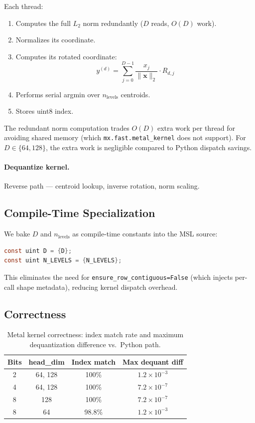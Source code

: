 \documentclass[11pt,a4paper]{article}
\begin{document}
Each thread:
\begin{enumerate}[label=\arabic*.]
  \item Computes the full $L_2$ norm redundantly ($D$ reads, $O(D)$ work).
  \item Normalizes its coordinate.
  \item Computes its rotated coordinate:
    \begin{equation}
      y^{(d)} = \sum_{j=0}^{D-1} \frac{x_j}{\|\mathbf{x}\|_2} \cdot R_{d,j}
    \end{equation}
  \item Performs serial argmin over $n_\text{levels}$ centroids.
  \item Stores uint8 index.
\end{enumerate}

The redundant norm computation trades $O(D)$ extra work per thread for avoiding shared memory (which \texttt{mx.fast.metal\_kernel} does not support). For $D \in \{64, 128\}$, the extra work is negligible compared to Python dispatch savings.

\paragraph{Dequantize kernel.} Reverse path --- centroid lookup, inverse rotation, norm scaling.

\subsection{Compile-Time Specialization}

We bake $D$ and $n_\text{levels}$ as compile-time constants into the MSL source:

\begin{lstlisting}[language=C]
const uint D = {D};
const uint N_LEVELS = {N_LEVELS};
\end{lstlisting}

This eliminates the need for \texttt{ensure\_row\_contiguous=False} (which injects per-call shape metadata), reducing kernel dispatch overhead.

\subsection{Correctness}

\begin{table}[h]
\centering
\caption{Metal kernel correctness: index match rate and maximum dequantization difference vs.\ Python path.}
\label{tab:kernel-correctness}
\begin{tabular}{cccc}
\toprule
\textbf{Bits} & \textbf{head\_dim} & \textbf{Index match} & \textbf{Max dequant diff} \\
\midrule
2 & 64, 128 & 100\%  & $1.2 \times 10^{-3}$ \\
4 & 64, 128 & 100\%  & $7.2 \times 10^{-7}$ \\
8 & 128     & 100\%  & $7.2 \times 10^{-7}$ \\
8 & 64      & 98.8\% & $1.2 \times 10^{-3}$ \\
\bottomrule
\end{tabular}
\end{table}
\end{document}
